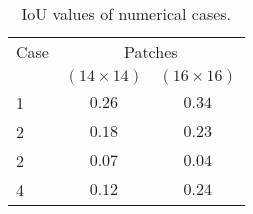 \begin{table}[ht!]
	\centering
	\caption{IoU values of numerical cases.}
	\label{tab:table_all_numerical_cases_bounding_boxes}
	{
		\begin{tabular}{lcc}
			\toprule
			Case & \multicolumn{2}{c}{Patches} \\ 
			\cmidrule(lr){2-3} & \multicolumn{1}{c}{\((14\times14)\)} & \multicolumn{1}{c}{\((16\times16)\)} \\			
			\midrule 
			1 & \(0.26\) & \(0.34\) \\
			2 & \(0.18\) & \(0.23\) \\
			2 & \(0.07\) & \(0.04\) \\
			4 & \(0.12\) & \(0.24\) \\
			\bottomrule
		\end{tabular}
	}
\end{table}
